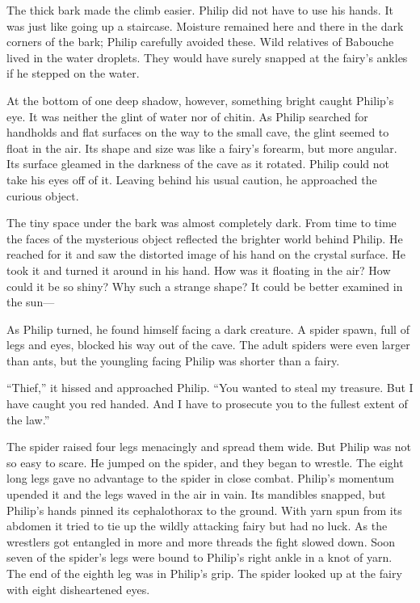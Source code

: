 \documentclass[10pt]{memoir}
\begin{document}
The thick bark made the climb easier. Philip did not have to use his hands. It
was just like going up a staircase. Moisture remained here and there in the
dark corners of the bark; Philip carefully avoided these. Wild relatives of
Babouche lived in the water droplets. They would have surely snapped at the
fairy's ankles if he stepped on the water.

At the bottom of one deep shadow, however, something bright caught Philip's
eye. It was neither the glint of water nor of chitin. As Philip searched for
handholds and flat surfaces on the way to the small cave, the glint seemed to
float in the air. Its shape and size was like a fairy's forearm, but more
angular. Its surface gleamed in the darkness of the cave as it rotated. Philip
could not take his eyes off of it. Leaving behind his usual caution, he
approached the curious object.

The tiny space under the bark was almost completely dark. From time to time the
faces of the mysterious object reflected the brighter world behind Philip. He
reached for it and saw the distorted image of his hand on the crystal surface.
He took it and turned it around in his hand. How was it floating in the air?
How could it be so shiny? Why such a strange shape? It could be better examined
in the sun---

As Philip turned, he found himself facing a dark creature. A spider spawn, full
of legs and eyes, blocked his way out of the cave. The adult spiders were even
larger than ants, but the youngling facing Philip was shorter than a fairy.

``Thief,'' it hissed and approached Philip. ``You wanted to steal my treasure.
But I have caught you red handed. And I have to prosecute you to the fullest
extent of the law.''

The spider raised four legs menacingly and spread them wide. But Philip was not
so easy to scare. He jumped on the spider, and they began to wrestle. The eight
long legs gave no advantage to the spider in close combat. Philip's momentum
upended it and the legs waved in the air in vain. Its mandibles snapped, but
Philip's hands pinned its cephalothorax to the ground. With yarn spun from its
abdomen it tried to tie up the wildly attacking fairy but had no luck. As the
wrestlers got entangled in more and more threads the fight slowed down. Soon
seven of the spider's legs were bound to Philip's right ankle in a knot of
yarn. The end of the eighth leg was in Philip's grip. The spider looked up at
the fairy with eight disheartened eyes.
\end{document}
